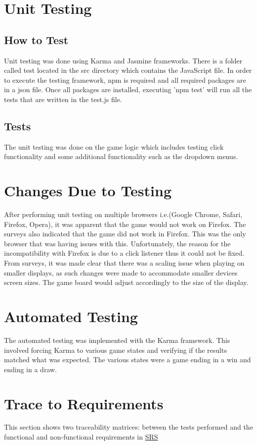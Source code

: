 \documentclass[12pt, titlepage]{article}
\begin{document}
\section{Unit Testing}
\subsection{How to Test}
Unit testing was done using Karma and Jasmine frameworks. There is a folder called test
located in the src directory which contains the JavaScript file. In order to execute the testing framework, 
npm is required and all required packages are in a json file. Once all packages are installed, 
executing 'npm test' will run all the tests that are written in the test.js file.
\subsection{Tests}
The unit testing was done on the game logic which includes testing click functionality and some additional functionality such as the dropdown menus.
\section{Changes Due to Testing} \label{ChangesAfterTesting}
After performing unit testing on multiple browsers i.e.(Google Chrome, Safari, Firefox, Opera),
it was apparent that the game would not work on Firefox. The surveys also indicated that the game did
not work in Firefox. This was the only browser that was having issues with this. Unfortunately,
the reason for the incompatibility with Firefox is due to a click listener thus it could not be fixed. From
surveys, it was made clear that there was a scaling issue when playing on smaller displays, as such
changes were made to accommodate smaller devices screen sizes. The game board would adjust 
accordingly to the size of the display. 
\section{Automated Testing}
The automated testing was implemented with the Karma framework. This involved forcing Karma
to various game states and verifying if the results matched what was expected. The various 
states were a game ending in a win and ending in a draw.

\section{Trace to Requirements}
This section shows two traceability matrices: between the tests performed and the functional and non-functional requirements in \href{run:../SRS/SRS.pdf}{SRS}
\end{document}

